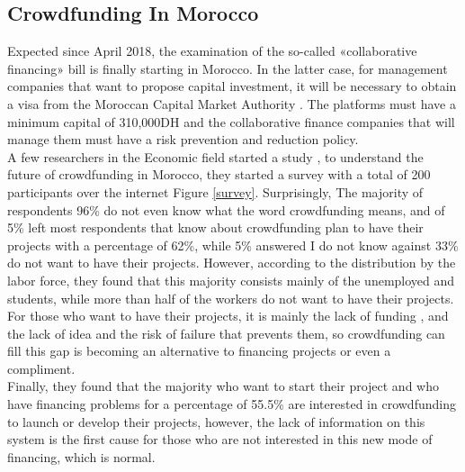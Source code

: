 \subsection*{ Crowdfunding In Morocco }
Expected since April 2018, the examination of the so-called «collaborative financing» bill is finally starting in Morocco. In the latter case, for management companies that want to propose capital investment, it will be necessary to obtain a visa from the Moroccan Capital Market Authority . The platforms must have a minimum capital of 310,000DH and the collaborative finance companies that will manage them must have a risk prevention and reduction policy.\\
A few researchers in the Economic field started a study \cite{crowdMorocco}, to understand the future of crowdfunding in Morocco, they started a survey with a total of 200 participants over the internet Figure \ref{survey}. Surprisingly,  The majority of respondents 96\% do not even know what the word crowdfunding means, and of 5\% left most respondents that know about crowdfunding plan to have their projects with a percentage of 62\%, while 5\% answered I do not know against 33\% do not want to have their projects. However, according to the distribution by the labor force, they found that this majority consists mainly of the unemployed and students, while more than half of the workers do not want to have their projects. For those who want to have their projects, it is mainly the lack of funding , and the lack of idea and the risk of failure that prevents them, so crowdfunding can fill this gap is becoming an alternative to financing projects or even a compliment.\\
Finally, they found that the majority who want to start their project and who have financing problems for a percentage of 55.5\% are interested in crowdfunding to launch or develop their projects, however, the lack of information on this system is the first cause for those who are not interested in this new mode of financing, which is normal.

